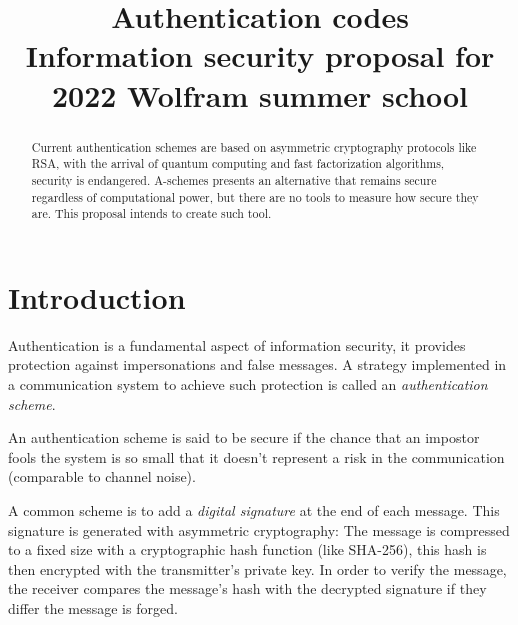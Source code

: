 \documentclass[conference]{IEEEtran}
\begin{document}
\title{
Authentication codes  \\
{\footnotesize Information security proposal for 2022 Wolfram summer school}
}

\author{
}

\maketitle

\begin{abstract}
    Current authentication schemes are based on asymmetric cryptography protocols like RSA, with the arrival of quantum computing and fast factorization algorithms, security is endangered. A-schemes presents an alternative that remains secure regardless of computational power, but there are no tools to measure how secure they are. This proposal intends to create such tool.
\end{abstract}


%
%
\section{Introduction}
Authentication is a fundamental aspect of information security, it provides protection against impersonations and false messages. A strategy implemented in a communication system to achieve such protection is called an \textit{authentication scheme}.

An authentication scheme is said to be secure if the chance that an impostor fools the system is so small that it doesn't represent a risk in the communication (comparable to channel noise).

A common scheme is to add a \textit{digital signature} at the end of each message. This signature is generated with asymmetric cryptography: The message is compressed to a fixed size with a cryptographic hash function (like SHA-256), this hash is then encrypted with the transmitter's private key. In order to verify the message, the receiver compares the message's hash with the decrypted signature if they differ the message is forged.
\end{document}
